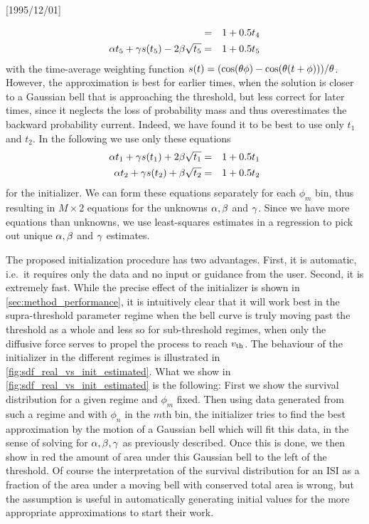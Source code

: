\NeedsTeXFormat{LaTeX2e}[1995/12/01] \documentclass[10pt]{bmc_article}
\newenvironment{bmcformat}{\begin{raggedright}\baselineskip20pt\sloppy\setboolean{publ}{false}}{\end{raggedright}\baselineskip20pt\sloppy}
\begin{document}
\begin{bmcformat}
\begin{eqnarray*}
&=& 1 + 0.5 t_4 
\\
{\alpha} t_5 + {\gamma } s(t_5) - 2{\beta} \sqrt{t_5}
&=& 1 + 0.5 t_5 
\end{eqnarray*}
with the time-average weighting function $s(t) = (\cos({\theta} \phi)
-\cos({\theta}(t+\phi)))/{{\theta}} $. However, the  approximation is best for earlier
times, when the solution is closer to a Gaussian bell that is approaching the
threshold, but less correct for later times, since it neglects the loss of
probability mass and thus overestimates the backward probability current.
Indeed, we have found it to be best to use only $t_1$ and $t_2$. In the
following we use only these equations
\begin{eqnarray*}
{\alpha} t_1 + {\gamma } s(t_1) + 2{\beta} \sqrt{t_1}
&=& 1 + 0.5 t_1
\\
{\alpha} t_2 + {\gamma } s(t_2) + {\beta} \sqrt{t_2}
&=& 1 + 0.5 t_2 
\end{eqnarray*}
for the initializer.
We can form these equations separately for each $\phi_m$ bin, thus
resulting in $M \times 2$ equations for the unknowns ${\alpha}, {\beta}$ and ${\gamma }$. Since
we have more equations than unknowns, we use least-squares estimates in a
regression to pick out unique ${\alpha},{\beta}$ and ${\gamma }$ estimates. 

The proposed initialization procedure has two advantages. First, it is
automatic, i.e.\ it requires only the data and no input or  guidance from the
user. Second, it is extremely fast. While the precise effect of the initializer
is shown in \cref{sec:method_performance}, it is intuitively clear that it will
work best in the supra-threshold parameter regime when the bell curve is truly
moving past the threshold as a whole and less so for sub-threshold regimes, when
only the diffusive force serves to propel the process to reach ${ v_{\textrm{th} } }$. The
behaviour of the initializer in the different regimes is illustrated in
\cref{fig:sdf_real_vs_init_estimated}. What we show in
\cref{fig:sdf_real_vs_init_estimated} is the following: First we show the
survival distribution for a given regime and $\phi_m$ fixed. Then using data
generated from such a regime and with $\phi_n$ in the $m$th bin, the initializer
tries to find the best approximation by the motion of a Gaussian bell which will
fit this data, in the sense of solving for ${\alpha},{\beta},{\gamma }$ as previously described.
Once this is done, we then show in red the amount of area under this Gaussian
bell to the left of the threshold. Of course the interpretation of the survival
distribution for an ISI as a fraction of the area under a moving bell with
conserved total area is wrong, but the assumption is useful in automatically
generating initial values for the more appropriate approximations to start their
work.


\end{bmcformat}
\end{document}
